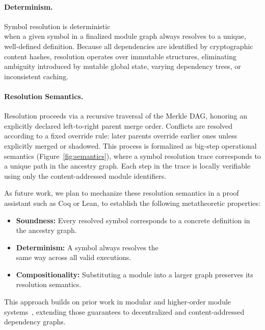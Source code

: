 \documentclass[sigplan,screen]{acmart}
\begin{document}
\paragraph{Determinism.}
Symbol resolution is deterministic \\when a given symbol in a finalized module graph always resolves to a unique, well-defined definition. Because all dependencies are identified by cryptographic content hashes, resolution operates over immutable structures, eliminating ambiguity introduced by mutable global state, varying dependency trees, or inconsistent caching.

\paragraph{Resolution Semantics.}
Resolution proceeds via a recursive traversal of the Merkle DAG, honoring an explicitly declared left-to-right parent merge order. Conflicts are resolved according to a fixed override rule: later parents override earlier ones unless explicitly merged or shadowed. This process is formalized as big-step operational semantics (Figure~\ref{fig:semantics}), where a symbol resolution trace corresponds to a unique path in the ancestry graph. Each step in the trace is locally verifiable using only the content-addressed module identifiers.

As future work, we plan to mechanize these resolution semantics in a proof assistant such as Coq or Lean, to establish the following metatheoretic properties:

\begin{itemize}
  \item \textbf{Soundness:} Every resolved symbol corresponds to a concrete definition in the ancestry graph.
  \item \textbf{Determinism:} A symbol always resolves the \\same way across all valid executions.
  \item \textbf{Compositionality:} Substituting a module into a larger graph preserves its resolution semantics.
\end{itemize}

This approach builds on prior work in modular and higher-order module systems~\cite{dreyer2007modular}, extending those guarantees to decentralized and content-addressed dependency graphs.
\end{document}
